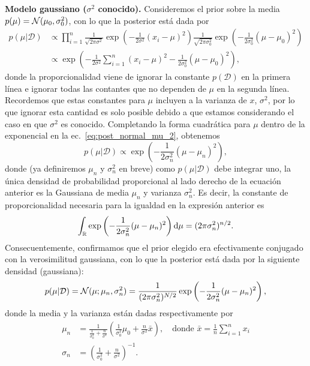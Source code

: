 \begin{example} \textbf{Modelo gaussiano ($\sigma^2$ conocido).} Consideremos el prior sobre la media $p(\mu) = {\mathcal N}(\mu_0,\sigma_0^2)$, con lo que la posterior está dada por  
 \begin{align}
 	p(\mu|\mathcal{D}) &\propto \prod_{i=1}^n \frac{1}{\sqrt{2\pi\sigma^2}}\exp\left(-\frac{1}{2\sigma^2}(x_i-\mu)^2\right) \frac{1}{\sqrt{2\pi\sigma_0^2}}\exp\left(-\frac{1}{2\sigma_0^2}(\mu-\mu_0)^2\right)\label{eq:post_normal_mu_1}\\
 	&\propto \exp\left(-\frac{1}{2\sigma^2}\sum_{i=1}^n(x_i-\mu)^2-\frac{1}{2\sigma_0^2}(\mu-\mu_0)^2\right),\label{eq:post_normal_mu_2}
 \end{align} 
 donde la proporcionalidad viene de ignorar la constante $p(\mathcal{D})$ en la primera línea e ignorar todas las contantes que no dependen de $\mu$ en la segunda línea. Recordemos que estas constantes para $\mu$ incluyen a la varianza de $x$, $\sigma^2$, por lo que ignorar esta cantidad es solo posible debido a que estamos considerando el caso en que $\sigma^2$ es conocido. Completando la forma cuadrática para $\mu$ dentro de la exponencial en la ec.~\eqref{eq:post_normal_mu_2}, obtenemos
 \begin{equation}
 	p(\mu|\mathcal{D}) \propto \exp\left(-\frac{1}{2\sigma_n^2}(\mu - \mu_n)^2\right),\label{eq:post_normal_mu_3}
 \end{equation} 
 donde (ya definiremos $\mu_n$ y $\sigma_n^2$ en breve) como $p(\mu|\mathcal{D})$ debe integrar uno, la única densidad de probabilidad proporcional al lado derecho de la ecuación anterior es la Gaussiana de media $\mu_n$ y varianza $\sigma_n^2$. Es decir, la constante de proporcionalidad necesaria para la igualdad en la expresión anterior es
 \begin{equation}
     \int_{\mathbb R}\exp\left(-\frac{1}{2\sigma_n^2}(\mu - \mu_n)^2\right){\text{d}}\mu = (2\pi\sigma_n^2)^{n/2}.
 \end{equation} Consecuentemente, confirmamos que el prior elegido era efectivamente conjugado con la verosimilitud gaussiana, con lo que la posterior está dada por la siguiente densidad (gaussiana):
  \begin{equation}
 	p(\mu|\mathcal{D}) = {\mathcal N}(\mu;\mu_n,\sigma_n^2) = \frac{1}{(2\pi\sigma_n^2)^{N/2}}\exp\left(-\frac{1}{2\sigma_n^2}(\mu - \mu_n)^2\right),\label{eq:post_normal_mu_4}
 \end{equation} 
 donde la media y la varianza están dadas respectivamente  por 
 \begin{align}
 	\mu_n &= \frac{1}{\tfrac{1}{\sigma_0^2} + \tfrac{n}{\sigma^2}} \left(\frac{1}{\sigma_0^2}\mu_0 + \frac{n}{\sigma^2}\bar{x} \right), \quad \text{donde } \bar{x} = \frac{1}{n}\sum_{i=1}^n x_i\label{eq:post_Gm}\\
 	\sigma_n &= \left(\frac{1}{\sigma_0^2} + \frac{n}{\sigma^2}\right)^{-1}.\label{eq:post_Gv}
 \end{align}
\end{example}
